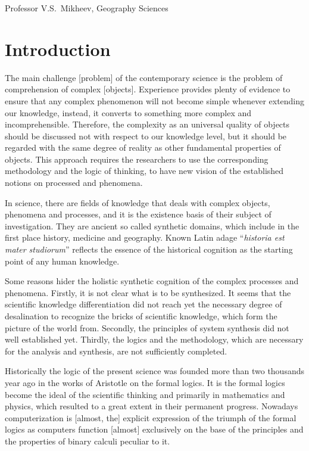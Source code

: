 \documentclass[12pt,leqno]{book}
\begin{document}
\vspace{1em}
\noindent{} \hfill{} Professor V.S.~Mikheev, Geography Sciences

\chapter*{Introduction}\normalsize

The main challenge [problem] of the contemporary science is the problem of comprehension of complex [objects]. Experience provides plenty of evidence to ensure that any complex phenomenon will not become simple whenever extending our knowledge, instead, it converts to something more complex and incomprehensible. Therefore, the complexity as an universal quality of objects should be discussed not with respect to our knowledge level, but it should be regarded with the same degree of reality as other fundamental properties of objects. This approach requires the researchers to use the corresponding methodology and the logic of thinking, to have new vision of the established notions on processed and phenomena.

In science, there are fields of knowledge that deals with complex objects, phenomena and processes, and it is the existence basis of their subject of investigation. They are ancient so called synthetic domains, which include in the first place history, medicine and geography. Known Latin adage ``\emph{historia est mater studiorum}'' reflects the essence of the historical cognition as the starting point of any human knowledge.

Some reasons hider the holistic synthetic cognition of the complex processes and phenomena. Firstly, it is not clear what is to be synthesized. It seems that the scientific knowledge differentiation did not reach yet the necessary degree of desalination to recognize the bricks of scientific knowledge, which form the picture of the world from. Secondly, the principles of system synthesis did not well established yet. Thirdly, the logics and the methodology, which are necessary for the analysis and synthesis, are not sufficiently completed.

Historically the logic of the present science was founded more than two thousands year ago in the works of Aristotle on the formal logics. It is the formal logics become the ideal of the scientific thinking and primarily in mathematics and physics, which resulted to a great extent in their permanent progress. Nowadays computerization is [almost, the] explicit expression of the triumph of the formal logics as computers function [almost] exclusively on the base of the principles and the properties of binary calculi peculiar to it.
\end{document}

